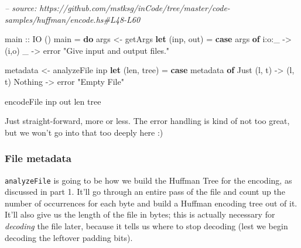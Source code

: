 \documentclass[]{article}
\newenvironment{Shaded}{}{}
\newcommand{\CommentTok}[1]{\textcolor[rgb]{0.38,0.63,0.69}{\textit{#1}}}
\newcommand{\DataTypeTok}[1]{\textcolor[rgb]{0.56,0.13,0.00}{#1}}
\newcommand{\FunctionTok}[1]{\textcolor[rgb]{0.02,0.16,0.49}{#1}}
\newcommand{\KeywordTok}[1]{\textcolor[rgb]{0.00,0.44,0.13}{\textbf{#1}}}
\newcommand{\NormalTok}[1]{#1}
\newcommand{\OtherTok}[1]{\textcolor[rgb]{0.00,0.44,0.13}{#1}}
\newcommand{\StringTok}[1]{\textcolor[rgb]{0.25,0.44,0.63}{#1}}
\begin{document}
\begin{Shaded}
\begin{Highlighting}[]
\CommentTok{-- source: https://github.com/mstksg/inCode/tree/master/code-samples/huffman/encode.hs#L48-L60}

\OtherTok{main ::} \DataTypeTok{IO}\NormalTok{ ()}
\NormalTok{main }\FunctionTok{=} \KeywordTok{do}
\NormalTok{    args     }\OtherTok{<-}\NormalTok{ getArgs}
    \KeywordTok{let}\NormalTok{ (inp, out)  }\FunctionTok{=} \KeywordTok{case}\NormalTok{ args }\KeywordTok{of}
\NormalTok{                        i}\FunctionTok{:}\NormalTok{o}\FunctionTok{:}\NormalTok{_      }\OtherTok{->}\NormalTok{ (i,o)}
\NormalTok{                        _          }\OtherTok{->}\NormalTok{ error }\StringTok{"Give input and output files."}

\NormalTok{    metadata }\OtherTok{<-}\NormalTok{ analyzeFile inp}
    \KeywordTok{let}\NormalTok{ (len, tree) }\FunctionTok{=} \KeywordTok{case}\NormalTok{ metadata }\KeywordTok{of}
                        \DataTypeTok{Just}\NormalTok{ (l, t) }\OtherTok{->}\NormalTok{ (l, t)}
                        \DataTypeTok{Nothing}     \OtherTok{->}\NormalTok{ error }\StringTok{"Empty File"}

\NormalTok{    encodeFile inp out len tree}
\end{Highlighting}
\end{Shaded}

Just straight-forward, more or less. The error handling is kind of not too
great, but we won't go into that too deeply here :)

\hypertarget{file-metadata}{%
\subsubsection{File metadata}\label{file-metadata}}

\texttt{analyzeFile} is going to be how we build the Huffman Tree for the
encoding, as discussed in part 1. It'll go through an entire pass of the file
and count up the number of occurrences for each byte and build a Huffman
encoding tree out of it. It'll also give us the length of the file in bytes;
this is actually necessary for \emph{decoding} the file later, because it tells
us where to stop decoding (lest we begin decoding the leftover padding bits).
\end{document}
